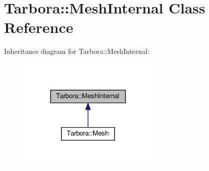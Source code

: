 \hypertarget{classTarbora_1_1MeshInternal}{}\section{Tarbora\+:\+:Mesh\+Internal Class Reference}
\label{classTarbora_1_1MeshInternal}


Inheritance diagram for Tarbora\+:\+:Mesh\+Internal\+:\nopagebreak
\begin{figure}[H]
\begin{center}
\leavevmode
\includegraphics[width=192pt]{classTarbora_1_1MeshInternal__inherit__graph}
\end{center}
\end{figure}
